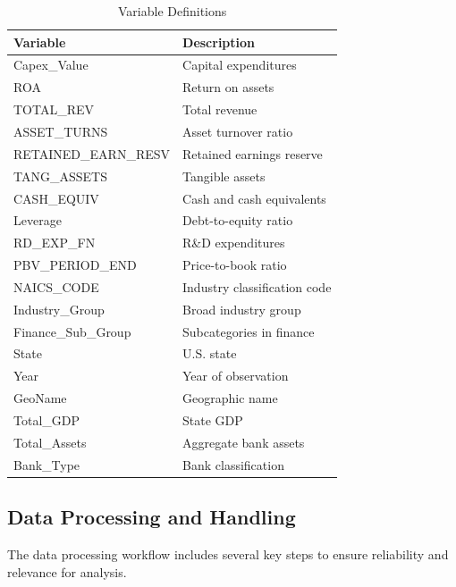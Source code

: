 \documentclass[11pt]{article}
\begin{document}
\begin{table}[htbp]
\centering
\caption{Variable Definitions}
\label{tab:variables}
\begin{tabular}{ll}
\toprule
\textbf{Variable}       & \textbf{Description} \\ 
\midrule
Capex\_Value            & Capital expenditures \\
ROA                     & Return on assets \\
TOTAL\_REV              & Total revenue \\
ASSET\_TURNS            & Asset turnover ratio \\
RETAINED\_EARN\_RESV    & Retained earnings reserve \\
TANG\_ASSETS            & Tangible assets \\
CASH\_EQUIV             & Cash and cash equivalents \\
Leverage                & Debt-to-equity ratio \\
RD\_EXP\_FN             & R\&D expenditures \\
PBV\_PERIOD\_END        & Price-to-book ratio \\
NAICS\_CODE             & Industry classification code \\
Industry\_Group         & Broad industry group \\
Finance\_Sub\_Group     & Subcategories in finance \\
State                   & U.S. state \\
Year                    & Year of observation \\
GeoName                 & Geographic name \\
Total\_GDP              & State GDP \\
Total\_Assets           & Aggregate bank assets \\
Bank\_Type              & Bank classification \\
\bottomrule
\end{tabular}
\end{table}
















\subsection{Data Processing and Handling}
The data processing workflow includes several key steps to ensure reliability and relevance for analysis.
\end{document}
